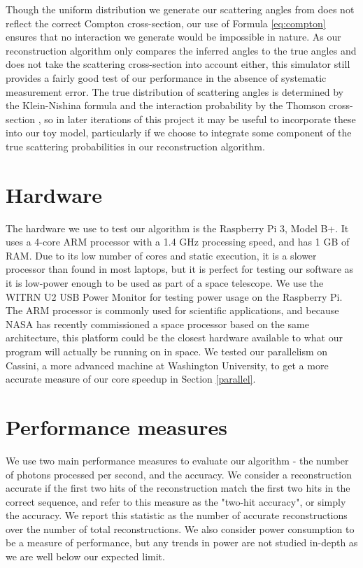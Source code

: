 Though the uniform distribution we generate our scattering angles from does not reflect the correct Compton cross-section, our use of Formula \ref{eq:compton} ensures that no interaction we generate would be impossible in nature. As our reconstruction algorithm only compares the inferred angles to the true angles and does not take the scattering cross-section into account either, this simulator still provides a fairly good test of our performance in the absence of systematic measurement error. The true distribution of scattering angles is determined by the Klein-Nishina formula and the interaction probability by the Thomson cross-section \cite{klein-nishina}, so in later iterations of this project it may be useful to incorporate these into our toy model, particularly if we choose to integrate some component of the true scattering probabilities in our reconstruction algorithm.

\section{Hardware}
The hardware we use to test our algorithm is the Raspberry Pi 3, Model B+. It uses a 4-core ARM processor with a 1.4 GHz processing speed, and has 1 GB of RAM. Due to its low number of cores and static execution, it is a slower processor than found in most laptops, but it is perfect for testing our software as it is low-power enough to be used as part of a space telescope. We use the WITRN U2 USB Power Monitor\cite{WITRN} for testing power usage on the Raspberry Pi. The ARM processor is commonly used for scientific applications, and because NASA has recently commissioned a space processor based on the same architecture, this platform could be the closest hardware available to what our program will actually be running on in space. We tested our parallelism on Cassini, a more advanced machine at Washington University, to get a more accurate measure of our core speedup in Section \ref{parallel}.

\section{Performance measures}
We use two main performance measures to evaluate our algorithm - the number of photons processed per second, and the accuracy. We consider a reconstruction accurate if the first two hits of the reconstruction match the first two hits in the correct sequence, and refer to this measure as the "two-hit accuracy", or simply the accuracy. We report this statistic as the number of accurate reconstructions over the number of total reconstructions. We also consider power consumption to be a measure of performance, but any trends in power are not studied in-depth as we are well below our expected limit.

